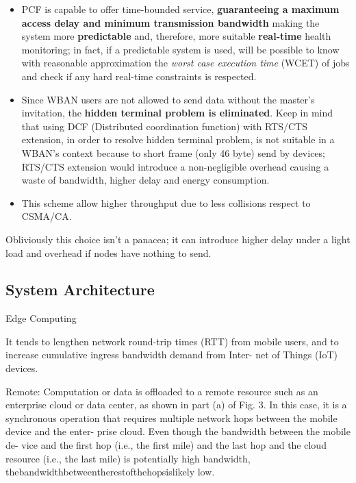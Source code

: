 \documentclass[sigchi]{acmart}
\begin{document}
\begin{itemize}

\item PCF is capable to offer time-bounded service, \textbf{guaranteeing a maximum access delay and minimum transmission bandwidth} making the system more \textbf{predictable} and, therefore, more suitable \textbf{real-time} health monitoring; in fact, if a predictable system is used, will be possible to know with reasonable approximation the \textit{worst case execution time} (WCET) of jobs and check if any hard real-time constraints is respected.

\item Since WBAN users are not allowed to send data without the master's invitation, the \textbf{hidden terminal problem is eliminated}. Keep in mind that using DCF (Distributed coordination function) with RTS/CTS extension, in order to resolve hidden terminal problem, is not suitable in a WBAN's context because to short frame (only 46 byte) send by devices; RTS/CTS extension would introduce a non-negligible overhead causing a waste of bandwidth, higher delay and energy consumption.

\item This scheme allow higher throughput due to less collisions respect to CSMA/CA.

\end{itemize}

Obliviously this choice isn't a panacea; it can introduce higher delay under a light load and overhead if nodes have nothing to send.

\subsection{System Architecture}

Edge Computing 

It tends to lengthen
network round-trip times (RTT) from mobile users, and to
increase cumulative ingress bandwidth demand from Inter-
net of Things (IoT) devices.

Remote: Computation or data is oﬄoaded to a remote resource
such as an enterprise cloud or data center, as shown in part (a)
of Fig. 3. In this case, it is a synchronous operation that requires
multiple network hops between the mobile device and the enter-
prise cloud. Even though the bandwidth between the mobile de-
vice and the ﬁrst hop (i.e., the ﬁrst mile) and the last hop and the
cloud resource (i.e., the last mile) is potentially high bandwidth,
thebandwidthbetweentherestofthehopsislikely low.
\end{document}
